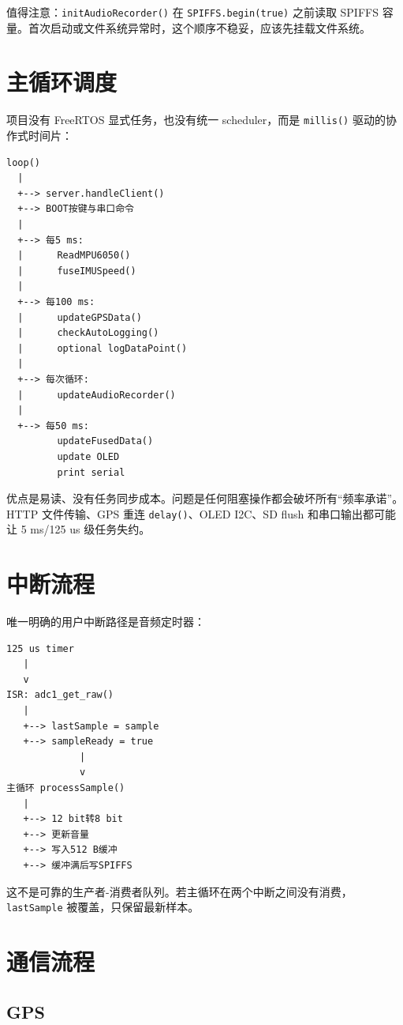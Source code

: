 \documentclass[
  UTF8,11pt,a4paper]{ctexart}
\newcommand{\passthrough}[1]{#1}
\begin{document}
值得注意：\passthrough{\lstinline!initAudioRecorder()!} 在
\passthrough{\lstinline!SPIFFS.begin(true)!} 之前读取 SPIFFS
容量。首次启动或文件系统异常时，这个顺序不稳妥，应该先挂载文件系统。

\section{主循环调度}\label{ux4e3bux5faaux73afux8c03ux5ea6}

项目没有 FreeRTOS 显式任务，也没有统一 scheduler，而是
\passthrough{\lstinline!millis()!} 驱动的协作式时间片：

\begin{lstlisting}
loop()
  |
  +--> server.handleClient()
  +--> BOOT按键与串口命令
  |
  +--> 每5 ms:
  |      ReadMPU6050()
  |      fuseIMUSpeed()
  |
  +--> 每100 ms:
  |      updateGPSData()
  |      checkAutoLogging()
  |      optional logDataPoint()
  |
  +--> 每次循环:
  |      updateAudioRecorder()
  |
  +--> 每50 ms:
         updateFusedData()
         update OLED
         print serial
\end{lstlisting}

优点是易读、没有任务同步成本。问题是任何阻塞操作都会破坏所有``频率承诺''。HTTP
文件传输、GPS 重连 \passthrough{\lstinline!delay()!}、OLED I2C、SD flush
和串口输出都可能让 5 ms/125 us 级任务失约。

\section{中断流程}\label{ux4e2dux65adux6d41ux7a0b}

唯一明确的用户中断路径是音频定时器：

\begin{lstlisting}
125 us timer
   |
   v
ISR: adc1_get_raw()
   |
   +--> lastSample = sample
   +--> sampleReady = true
             |
             v
主循环 processSample()
   |
   +--> 12 bit转8 bit
   +--> 更新音量
   +--> 写入512 B缓冲
   +--> 缓冲满后写SPIFFS
\end{lstlisting}

这不是可靠的生产者-消费者队列。若主循环在两个中断之间没有消费，\passthrough{\lstinline!lastSample!}
被覆盖，只保留最新样本。

\section{通信流程}\label{ux901aux4fe1ux6d41ux7a0b}

\subsection{GPS}\label{gps}
\end{document}

